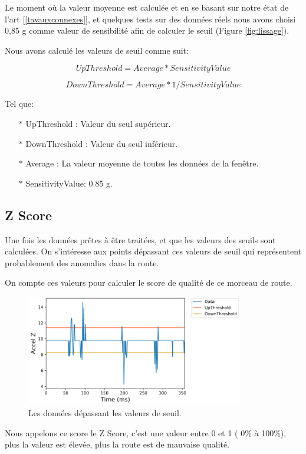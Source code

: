 Le moment où la valeur moyenne est calculée  et en se basant sur notre état de l'art [\ref{tavauxconnexes}], et quelques tests sur des données réels nous avons choisi 0,85 g comme valeur de sensibilité afin de calculer le seuil (Figure  \ref{fig:lissage}).

Nous avons calculé les valeurs de seuil comme suit:

\[UpThreshold = Average   * SensitivityValue\]

\[DownThreshold =  Average  * 1/SensitivityValue\]

  Tel que:
  
\begin{itemize}
  \item[$\ast$] UpThreshold : Valeur du seul supérieur.
  \item[$\ast$] DownThreshold : Valeur du seul inférieur.
  \item[$\ast$] Average : La valeur moyenne de toutes les données de la fenêtre.
  \item[$\ast$] SensitivityValue: 0.85 g.
\end{itemize}


\subsection{Z Score}
Une fois les données prêtes à être traitées, et que les valeurs des seuils sont calculées. On s’intéresse aux points dépassant ces valeurs de seuil qui représentent probablement des anomalies dans la route.

On compte ces valeurs pour calculer le score de qualité de ce morceau  de route.




\begin{figure}[h!]
  \center
  \includegraphics[width=0.85\textwidth]{Images/chapter2/approache/zscore.PNG}
  \caption{Les données  dépassant les valeurs de seuil.}
  \label{fig:zscore}
\end{figure}

Nous appelons ce score le Z Score, c'est une valeur entre 0 et 1 ( 0\% à 100\%), plus la valeur est élevée, plus la route est de mauvaise qualité.